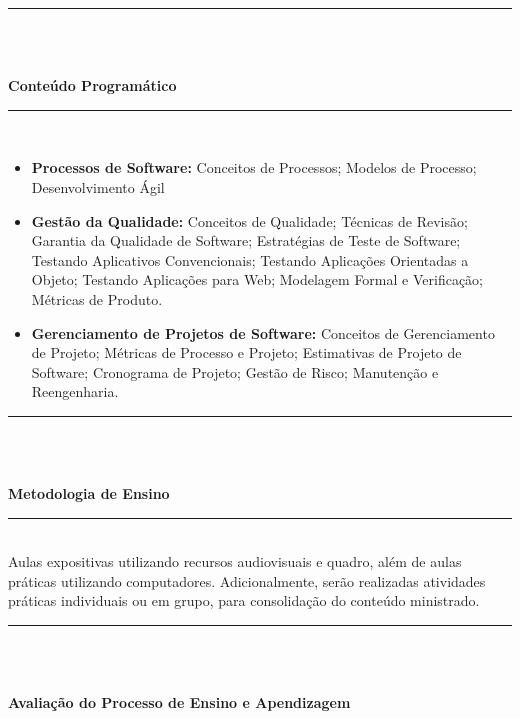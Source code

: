 \noindent\rule{16.5cm}{0.4pt}\\
\\
\vspace{-12mm}
\begin{center}\textbf{Conteúdo Programático}\end{center}
\vspace{-5mm}
\noindent\rule{16.5cm}{0.4pt}
\\
\begin{itemize}
 \item \textbf{Processos de Software:} Conceitos de Processos; Modelos de Processo; Desenvolvimento Ágil

 \item \textbf{Gestão da Qualidade:} Conceitos de Qualidade; Técnicas de Revisão; Garantia da Qualidade de Software; Estratégias de Teste de Software; Testando Aplicativos Convencionais; Testando Aplicações Orientadas a Objeto; Testando Aplicações para Web; Modelagem Formal e Verificação; Métricas de Produto.
\item \textbf{Gerenciamento de Projetos de Software:}  Conceitos de Gerenciamento de Projeto; Métricas de Processo e Projeto; Estimativas de Projeto de Software; Cronograma de Projeto; Gestão de Risco; Manutenção e Reengenharia.
\end{itemize}
\noindent\rule{16.5cm}{0.4pt}\\
\\
\vspace{-12mm}
\begin{center}\textbf{Metodologia de Ensino}\end{center} 
\vspace{-5mm}
\noindent\rule{16.5cm}{0.4pt}
\\
   Aulas expositivas utilizando recursos audiovisuais e quadro, além de aulas práticas utilizando computadores. Adicionalmente, serão realizadas atividades práticas individuais ou em grupo, para consolidação do conteúdo ministrado.\\
\noindent\rule{16.5cm}{0.4pt}\\
\\
\vspace{-12mm}
\begin{center}\textbf{Avaliação do Processo de Ensino e Apendizagem}\end{center}
\vspace{-5mm}
